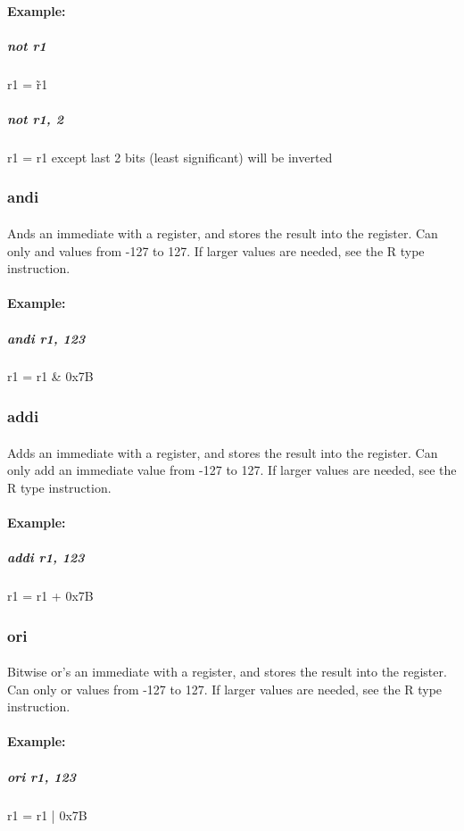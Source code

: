 \documentclass[a4paper]{article}
\begin{document}
\paragraph{Example:}
\subparagraph{not r1} r1 = \~r1
\subparagraph{not r1, 2} r1 = r1 except last 2 bits (least significant) will be inverted

\subsubsection{andi}
\paragraph{} Ands an immediate with a register, and stores the result into the register. Can only and values from -127 to 127. If larger values are needed, see the R type instruction.
\paragraph{Example:}
\subparagraph{andi r1, 123} r1 = r1 \& 0x7B

\subsubsection{addi}
\paragraph{} Adds an immediate with a register, and stores the result into the register. Can only add an immediate value from -127 to 127. If larger values are needed, see the R type instruction.
\paragraph{Example:}
\subparagraph{addi r1, 123} r1 = r1 + 0x7B

\subsubsection{ori}
\paragraph{} Bitwise or's  an immediate with a register, and stores the result into the register. Can only or values from -127 to 127. If larger values are needed, see the R type instruction.
\paragraph{Example:}
\subparagraph{ori r1, 123} r1 = r1 | 0x7B
\end{document}

